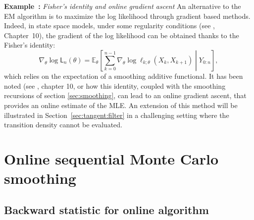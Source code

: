 \documentclass{article}
\newcommand{\llh}[1]{\mathsf{L}_{#1}}
\newcommand{\parvec}{\theta}
\newcommand{\deriv}{\nabla_{\parvec}}
\def\pE{\mathbb{E}}
\newcommand{\qg}[1]{\ell_{#1}}
\newcounter{example}[section]
\newenvironment{example}[1][]{\refstepcounter{example}\par\medskip
   \noindent \textbf{Example~\theexample:} \textit{#1} \text \rmfamily}{\medskip}
\begin{document}
\begin{example}[Fisher's identity and online gradient ascent]
An alternative to the EM algorithm is to maximize the log likelihood through gradient based methods.
Indeed, in state space models, under some regularity conditions (see \cite{cappe2005inference}, Chapter~10), the gradient of the log likelihood can be obtained thanks to the Fisher's identity:
$$\deriv \log \llh{n}(\parvec) = \pE_\theta\left[\sum_{k=0}^{n-1} \deriv \log \qg{k;\parvec}(X_{k},X_{k+1})\middle | Y_{0:n}\right],$$
which relies on the expectation of a smoothing additive functional.
It has been noted (see \cite{cappe2005inference}, chapter 10, or \cite{olsson2020particle} how this identity, coupled with the smoothing recursions of section \ref{sec:smoothing}, can lead to an online gradient ascent, that provides an online estimate of the MLE.
An extension of this method will be illustrated in Section~\ref{sec:tangent:filter} in a challenging setting where the transition density cannot be evaluated.
\end{example}

\section{Online sequential Monte Carlo smoothing}
\label{sec:method}

\subsection{Backward statistic for online algorithm}
\end{document}
